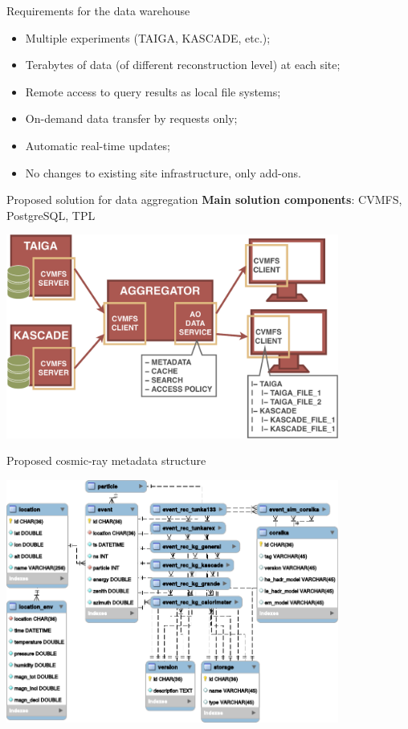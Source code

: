
\begin{frame}{Requirements for the data warehouse}
  \begin{itemize}
    \item Multiple experiments (TAIGA, KASCADE, etc.);
    \item Terabytes of data (of different reconstruction level) at each site;
    \item Remote access to query results as local file systems;
    \item  On-demand data transfer by requests only;
    \item  Automatic real-time updates;
    \item  No changes to existing site infrastructure, only add-ons.
  \end{itemize}
\end{frame}

\begin{frame}{Proposed solution for data aggregation}
\textbf{Main solution components}: CVMFS, PostgreSQL, TPL
    \begin{center}
        \includegraphics[width=0.82\textwidth]{pics/agr.pdf}
    \end{center}
\end{frame}


\begin{frame}{Proposed cosmic-ray metadata structure}
    \vspace{-1.5em}
    \begin{center}
        \includegraphics[width=0.82\textwidth]{pics/metadata.pdf}
    \end{center}
\end{frame}

